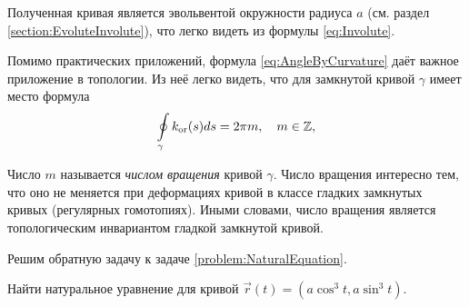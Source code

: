 Полученная кривая является эвольвентой окружности радиуса $a$ (см. раздел \ref{section:EvoluteInvolute}), что легко видеть из формулы \eqref{eq:Involute}.

Помимо практических приложений, формула \eqref{eq:AngleByCurvature} даёт важное приложение в топологии. Из неё легко видеть, что для замкнутой кривой $\gamma$ имеет место формула
\begin{equation} \label{eq:HomoTopInvariant}
	\oint\limits_{\gamma}k_{\mathrm{or}}(s)ds = 2\pi m,\quad m \in \mathbb{Z},
\end{equation}

Число $m$ называется \textit{числом вращения} кривой $\gamma$. Число вращения интересно тем, что оно не меняется при деформациях кривой в классе гладких замкнутых кривых (регулярных гомотопиях). Иными словами, число вращения является топологическим инвариантом гладкой замкнутой кривой.

Решим обратную задачу к задаче \ref{problem:NaturalEquation}.

\begin{problem}
	Найти натуральное уравнение для кривой $\vec{r}(t) = (a\cos^3t, a\sin^3t)$.
\end{problem}

